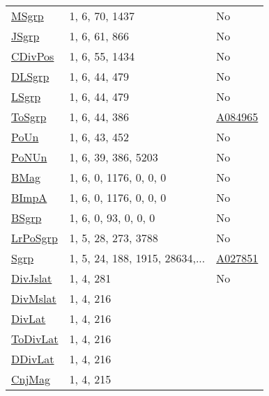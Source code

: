 {\begin{tabular}{|l|l|l|}
\hyperlink{MSgrp}{MSgrp}& 1, 6, 70, 1437 &No\\
\hyperlink{JSgrp}{JSgrp}& 1, 6, 61, 866 &No\\
\hyperlink{CDivPos}{CDivPos}& 1, 6, 55, 1434 &No\\
\hyperlink{DLSgrp}{DLSgrp}& 1, 6, 44, 479 &No\\
\hyperlink{LSgrp}{LSgrp}& 1, 6, 44, 479 &No\\
\hyperlink{ToSgrp}{ToSgrp}& 1, 6, 44, 386 &\href{http://oeis.org/A084965}{A084965}\\
\hyperlink{PoUn}{PoUn}& 1, 6, 43, 452 &No\\
\hyperlink{PoNUn}{PoNUn}& 1, 6, 39, 386, 5203 &No\\
\hyperlink{BMag}{BMag}& 1, 6, 0, 1176, 0, 0, 0 &No\\
\hyperlink{BImpA}{BImpA}& 1, 6, 0, 1176, 0, 0, 0 &No\\
\hyperlink{BSgrp}{BSgrp}& 1, 6, 0, 93, 0, 0, 0 &No\\
\hyperlink{LrPoSgrp}{LrPoSgrp}& 1, 5, 28, 273, 3788 &No\\
\hyperlink{Sgrp}{Sgrp}& 1, 5, 24, 188, 1915, 28634,...&\href{http://oeis.org/A027851}{A027851}\\
\hyperlink{DivJslat}{DivJslat}& 1, 4, 281 &No\\
\hyperlink{DivMslat}{DivMslat}& 1, 4, 216 &\\
\hyperlink{DivLat}{DivLat}& 1, 4, 216&\\
\hyperlink{ToDivLat}{ToDivLat}& 1, 4, 216&\\
\hyperlink{DDivLat}{DDivLat}& 1, 4, 216&\\
\hyperlink{CnjMag}{CnjMag}& 1, 4, 215&\\
\end{tabular}

}
